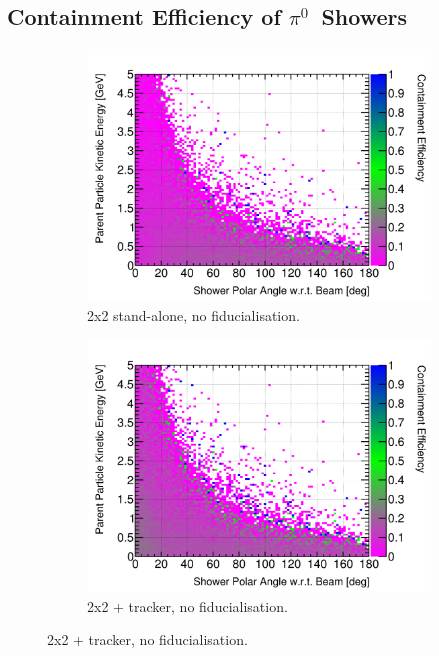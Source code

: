 \documentclass[10pt,a4paper,openany]{article}
\begin{document}
\subsection{Containment Efficiency of $\pi^{0}$~Showers}
\begin{figure}[!htb]
	\centering
	\begin{subfigure}[b]{0.49\textwidth}
		\centering
		\includegraphics[width=1.0\textwidth]{Pi0_cont_eff_2x2.png}
		\caption{2x2 stand-alone, no fiducialisation.}
		\label{}
	\end{subfigure}	
	\hfill
	\begin{subfigure}[b]{0.49\textwidth}
		\centering
		\includegraphics[width=1.0\textwidth]{Pi0_cont_eff_2x2_Scintillator_gap.png}
		\caption{2x2 + tracker, no fiducialisation.}

\end{subfigure}
\end{figure}
\end{document}
